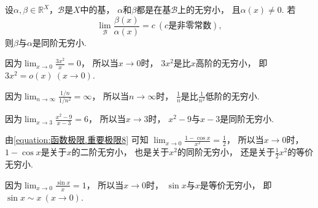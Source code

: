 \begin{proposition}
设\(\alpha,\beta\in\mathbb{R}^X\)，\(\mathcal{B}\)是\(X\)中的基，
\(\alpha\)和\(\beta\)都是在基\(\mathcal{B}\)上的无穷小，
且\(\alpha(x)\neq0\).
若\begin{equation*}
	\lim_\mathcal{B} \frac{\beta(x)}{\alpha(x)} = c\ (\text{$c$是非零常数}),
\end{equation*}
则\(\beta\)与\(\alpha\)是同阶无穷小.
\end{proposition}

\begin{example}
因为\(\lim_{x\to0} \frac{3x^2}{x} = 0\)，
所以当\(x\to0\)时，
\(3x^2\)是比\(x\)高阶的无穷小，
即\(3x^2 = o(x)\ (x\to0)\).
\end{example}

\begin{example}
因为\(\lim_{n\to\infty} \frac{1/n}{1/n^2} = \infty\)，
所以当\(n\to\infty\)时，
\(\frac{1}{n}\)是比\(\frac{1}{n^2}\)低阶的无穷小.
\end{example}

\begin{example}
因为\(\lim_{x\to3} \frac{x^2-9}{x-3} = 6\)，
所以当\(x\to3\)时，
\(x^2-9\)与\(x-3\)是同阶无穷小.
\end{example}

\begin{example}
由\cref{equation:函数极限.重要极限8} 可知
\(\lim_{x\to0} \frac{1-\cos x}{x^2} = \frac12\)，
所以当\(x\to0\)时，
\(1-\cos x\)是关于\(x\)的二阶无穷小，
也是关于\(x^2\)的同阶无穷小，
还是关于\(\frac12 x^2\)的等价无穷小.
\end{example}

\begin{example}
因为\(\lim_{x\to0} \frac{\sin x}{x} = 1\)，
所以当\(x\to0\)时，
\(\sin x\)与\(x\)是等价无穷小，
即\(\sin x \sim x\ (x\to0)\).
\end{example}

